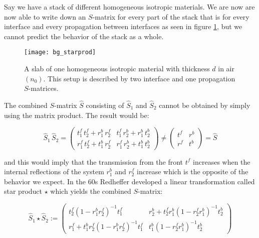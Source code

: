 Say we have a stack of different homogeneous isotropic materials. We are now are now able to write down an $S$-matrix for every part of the stack that is for every interface and every propagation between interfaces as seen in figure \ref{fig:bg:star_prod}, but we cannot predict the behavior of the stack as a whole.

\begin{figure}[H]
    \centering
    \texttt{[image: bg\_starprod]}
    \caption{A slab of one homogeneous isotropic material with thickness $d$ in air $(n_0)$. This setup is described by two interface and one propagation $S$-matrices.}
    \label{fig:bg:star_prod}
\end{figure}



The combined $S$-matrix $\hat S$ consisting of $\hat S_1$ and $\hat S_2$ cannot be obtained by simply using the matrix product. The result would be:

\begin{equation}
    \hat S_1 \, \hat S_2 =
    \begin{pmatrix}
        t^f_1 \, t^f_2 + r^b_1 \, r^f_2 & t^f_1 \, r^b_2 + r^b_1 \, t^b_2 \\
        r^f_1 \, t^f_2 + t^b_1 \, r^f_2 & r^f_1 \, r^b_2 + t^b_1 \, t^b_2
    \end{pmatrix} \neq
    \begin{pmatrix}
        t^f & r^b \\
        r^f & t^b
    \end{pmatrix} =
    \hat S
\end{equation}

and this would imply that the transmission from the front $t^f$ increases when the internal reflections of the system $r^b_1$ and $r^f_2$ increase which is the opposite of the behavior we expect. In the 60s Redheffer \cite{Redheffer1960} developed a linear transformation called star product $\star$ which yields the combined $S$-matrix:

\begin{equation}\label{eq:bg:star}
    \hat S_1 \star \hat S_2 :=
    \begin{pmatrix}
        t^f_2 (1 - r^b_1 r^f_2)^{-1} t^f_1 &
        r^b_2 + t^f_2 r^b_1 (1 - r^f_2 r^b_1)^{-1} t^b_2\\
        r^f_1 + t^b_1 r^f_2 (1 - r^b_1 r^f_2)^{-1} t^f_1 &
        t^b_1 (1 - r^f_2 r^b_1)^{-1} t^b_2
    \end{pmatrix}
\end{equation}
\\

